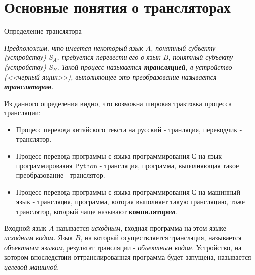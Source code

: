 \documentclass[12pt, pdf, hyperref={unicode},handout]{beamer}
\begin{document}
\section{Основные понятия о трансляторах}
\begin{frame}{Определение транслятора}
  \begin{block}

    \small{
      \textit{Предположим, что имеется некоторый язык  $A$, понятный субъекту (устройству) $S_A$, требуется перевести его в язык $B$, понятный субъекту (устройству) $S_B$. Такой процесс называется \textbf{трансляцией}, а устройство (<<черный ящик>>), выполняющее это преобразование называется \textbf{транслятором}.}

      Из данного определения видно, что возможна широкая трактовка процесса трансляции:
      \begin{itemize}
      \item{Процесс перевода китайского текста на русский - транляция, переводчик - транслятор.}
      \item{Процесс перевода программы с языка программирования С на язык программирования Python - трансляция, программа, выполняющая такое преобразование - транслятор.}
        \item{Процесс перевода программы с языка программирования С на машинный язык - трансляция, программа, которая выполняет такую трансляцию, тоже транслятор, который чаще называют \textbf{компилятором}.}
        \end{itemize}
      }
      Входной язык $A$ называется \textit{исходным}, входная программа на этом языке - \textit{исходным кодом}. Язык $B$, на который осуществляется трансляция, называется \textit{объектным языком}, результат трансляции - \textit{объектным кодом}. Устройство, на котором впоследствии оттранслированная программа будет запущена, называется \textit{целевой машиной}.

  \end{block}
  
\end{frame}
\end{document}
